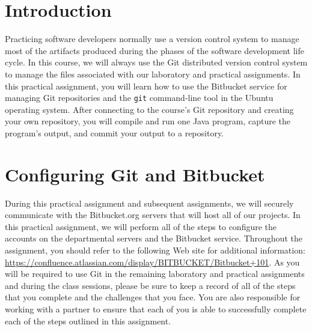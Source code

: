 


\usepackage[compact]{titlesec}



% 

\section*{Introduction}

Practicing software developers normally use a version control system to manage most of the artifacts produced during the
phases of the software development life cycle.  In this course, we will always use the Git distributed version control
system to manage the files associated with our laboratory and practical assignments.  In this practical assignment, you
will learn how to use the Bitbucket service for managing Git repositories and the {\tt git} command-line tool in the
Ubuntu operating system. After connecting to the course's Git repository and creating your own repository, you will
compile and run one Java program, capture the program's output, and commit your output to a repository.

\section*{Configuring Git and Bitbucket}

During this practical assignment and subsequent assignments, we will securely communicate with the Bitbucket.org
servers that will host all of our projects.  In this practical assignment, we will perform all of the steps to configure
the accounts on the departmental servers and the Bitbucket service.  Throughout the assignment, you should refer to the
following Web site for additional information: \url{https://confluence.atlassian.com/display/BITBUCKET/Bitbucket+101}.
As you will be required to use Git in the remaining laboratory and practical assignments and during the class sessions,
please be sure to keep a record of all of the steps that you complete and the challenges that you face.  You are also
responsible for working with a partner to ensure that each of you is able to successfully complete each of the steps
outlined in this assignment.

